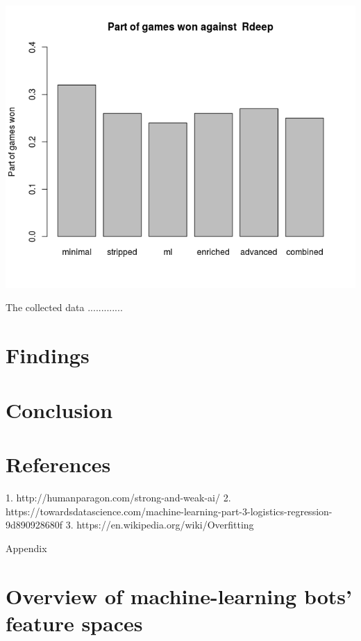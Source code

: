 \documentclass[a4paper,11pt]{article}
\begin{document}
\begin{center}
\begin{minipage}{0.49\linewidth}
\end{minipage}
      \\ %
\begin{minipage}{0.5\linewidth}
\includegraphics[width=\linewidth]{images/barplotRdeep.png}
\end{minipage}
\end{center}

The collected data .............

\section{Findings}

\section{Conclusion}

\section{References}
1. http://humanparagon.com/strong-and-weak-ai/
2. https://towardsdatascience.com/machine-learning-part-3-logistics-regression-9d890928680f
3. https://en.wikipedia.org/wiki/Overfitting

Appendix
\section{Overview of machine-learning bots' feature spaces}
\end{document}
